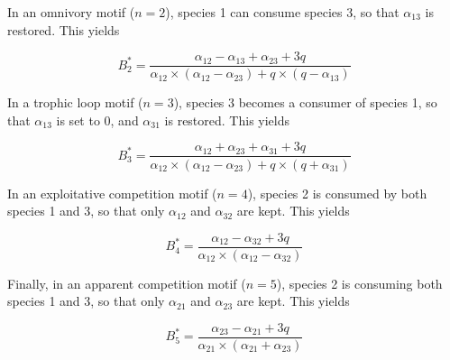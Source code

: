 \documentclass[11pt]{article}
\begin{document}
	In an omnivory motif ($n = 2$), species 1 can consume species 3, so that
	$\alpha_{13}$ is restored. This yields

	\begin{equation}
		B_2^* = \frac{\alpha_{12}-\alpha_{13}+\alpha_{23}+3q}{\alpha_{12}\times(\alpha_{12}-\alpha_{23})+q\times(q-\alpha_{13})}
	\end{equation}

	In a trophic loop motif ($n=3$), species 3 becomes a consumer of species
	1, so that $\alpha_{13}$ is set to 0, and $\alpha_{31}$ is restored. This
	yields

	\begin{equation}
		B_3^* = \frac{\alpha_{12}+\alpha_{23}+\alpha_{31}+3q}{\alpha_{12}\times(\alpha_{12}-\alpha_{23})+q\times(q+\alpha_{31})}
	\end{equation}

	In an exploitative competition motif ($n=4$), species 2 is consumed by
	both species 1 and 3, so that only $\alpha_{12}$ and $\alpha_{32}$ are
	kept. This yields

	\begin{equation}
		B_4^* = \frac{\alpha_{12}-\alpha_{32}+3q}{\alpha_{12}\times(\alpha_{12}-\alpha_{32})}
	\end{equation}

	Finally, in an apparent competition motif ($n=5$), species 2 is consuming
	both species 1 and 3, so that only $\alpha_{21}$ and $\alpha_{23}$ are
	kept. This yields

	\begin{equation}
		B_5^* = \frac{\alpha_{23}-\alpha_{21}+3q}{\alpha_{21}\times(\alpha_{21}+\alpha_{23})}
	\end{equation}
\end{document}
